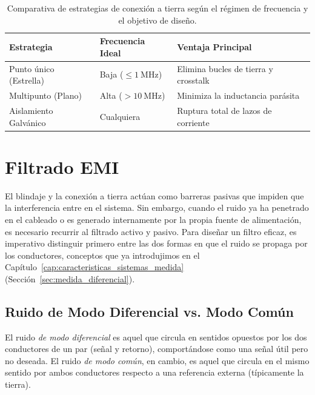 \begin{table}[ht]
    \centering
    \small
    \setlength{\tabcolsep}{3pt}
    \renewcommand{\tabularxcolumn}[1]{m{#1}}
    \begin{tabularx}{\linewidth}{@{} >{\centering\arraybackslash}X >{\centering\arraybackslash}X >{\centering\arraybackslash}X @{}}
        \toprule
        \textbf{Estrategia} & \textbf{Frecuencia Ideal} & \textbf{Ventaja Principal} \\
        \midrule
        Punto único (Estrella) & Baja ($\le \SI{1}{\mega\hertz}$) & Elimina bucles de tierra y crosstalk \\
        Multipunto (Plano) & Alta ($> \SI{10}{\mega\hertz}$) & Minimiza la inductancia parásita \\
        Aislamiento Galvánico & Cualquiera & Ruptura total de lazos de corriente \\
        \bottomrule
    \end{tabularx}
    \caption{Comparativa de estrategias de conexión a tierra según el régimen de frecuencia y el objetivo de diseño.\protect\label{tab:comparativa_tierras}}
\end{table}

\section{Filtrado EMI}\label{sec:filtrado_emi}

El blindaje y la conexión a tierra actúan como barreras pasivas que impiden que la interferencia entre en el sistema. Sin embargo, cuando el ruido ya ha penetrado en el cableado o es generado internamente por la propia fuente de alimentación, es necesario recurrir al filtrado activo y pasivo. Para diseñar un filtro eficaz, es imperativo distinguir primero entre las dos formas en que el ruido se propaga por los conductores, conceptos que ya introdujimos en el Capítulo~\ref{cap:caracteristicas_sistemas_medida} (Sección~\ref{sec:medida_diferencial}).

\subsection{Ruido de Modo Diferencial vs. Modo Común}\label{sub:modos_ruido}

El ruido \emph{de modo diferencial} es aquel que circula en sentidos opuestos por los dos conductores de un par (señal y retorno), comportándose como una señal útil pero no deseada. El ruido \emph{de modo común}, en cambio, es aquel que circula en el mismo sentido por ambos conductores respecto a una referencia externa (típicamente la tierra).

